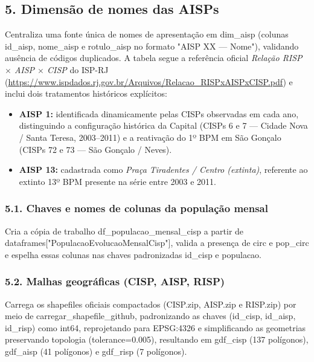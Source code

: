 \documentclass[11pt,a4paper]{article}
\newcommand{\code}[1]{{\ttfamily\footnotesize\allowbreak #1}}
\begin{document}
\subsection{5. Dimensão de nomes das AISPs}
Centraliza uma fonte única de nomes de apresentação em \code{dim\_aisp} (colunas \code{id\_aisp}, \code{nome\_aisp} e \code{rotulo\_aisp} no formato \code{"AISP XX --- Nome"}), validando ausência de códigos duplicados. A tabela segue a referência oficial \textit{Relação RISP $\times$ AISP $\times$ CISP} do ISP-RJ (\url{https://www.ispdados.rj.gov.br/Arquivos/Relacao_RISPxAISPxCISP.pdf}) e inclui dois tratamentos históricos explícitos:
\begin{itemize}
  \setlength{\itemsep}{2pt}\setlength{\parskip}{0pt}
  \item \textbf{AISP 1:} identificada dinamicamente pelas CISPs observadas em cada ano, distinguindo a configuração histórica da Capital (CISPs 6 e 7 --- Cidade Nova / Santa Teresa, 2003--2011) e a reativação do 1º BPM em São Gonçalo (CISPs 72 e 73 --- São Gonçalo / Neves).
  \item \textbf{AISP 13:} cadastrada como \textit{Praça Tiradentes / Centro (extinta)}, referente ao extinto 13º BPM presente na série entre 2003 e 2011.
\end{itemize}

\subsubsection*{5.1. Chaves e nomes de colunas da população mensal}
Cria a cópia de trabalho \code{df\_populacao\_mensal\_cisp} a partir de \code{dataframes["PopulacaoEvolucaoMensalCisp"]}, valida a presença de \code{circ} e \code{pop\_circ} e espelha essas colunas nas chaves padronizadas \code{id\_cisp} e \code{populacao}.

\subsubsection*{5.2. Malhas geográficas (CISP, AISP, RISP)}
Carrega os shapefiles oficiais compactados (\code{CISP.zip}, \code{AISP.zip} e \code{RISP.zip}) por meio de \code{carregar\_shapefile\_github}, padronizando as chaves (\code{id\_cisp}, \code{id\_aisp}, \code{id\_risp}) como \code{int64}, reprojetando para \code{EPSG:4326} e simplificando as geometrias preservando topologia (\code{tolerance=0.005}), resultando em \code{gdf\_cisp} (137 polígonos), \code{gdf\_aisp} (41 polígonos) e \code{gdf\_risp} (7 polígonos).
\end{document}
